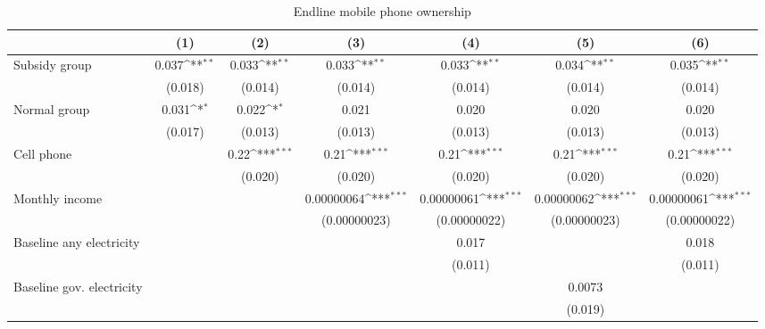 \begin{table}[htbp]\centering
\def\sym#1{\ifmmode^{#1}\else\(^{#1}\)\fi}
\caption{Endline mobile phone ownership}
\begin{tabular*}{1\hsize}{@{\hskip\tabcolsep\extracolsep\fill}l*{6}{c}}
\toprule
                &\multicolumn{1}{c}{(1)}         &\multicolumn{1}{c}{(2)}         &\multicolumn{1}{c}{(3)}         &\multicolumn{1}{c}{(4)}         &\multicolumn{1}{c}{(5)}         &\multicolumn{1}{c}{(6)}         \\
\midrule
Subsidy group   &    0.037\sym{**} &    0.033\sym{**} &    0.033\sym{**} &    0.033\sym{**} &    0.034\sym{**} &    0.035\sym{**} \\
                &  (0.018)         &  (0.014)         &  (0.014)         &  (0.014)         &  (0.014)         &  (0.014)         \\
Normal group    &    0.031\sym{*}  &    0.022\sym{*}  &    0.021         &    0.020         &    0.020         &    0.020         \\
                &  (0.017)         &  (0.013)         &  (0.013)         &  (0.013)         &  (0.013)         &  (0.013)         \\
Cell phone      &                  &     0.22\sym{***}&     0.21\sym{***}&     0.21\sym{***}&     0.21\sym{***}&     0.21\sym{***}\\
                &                  &  (0.020)         &  (0.020)         &  (0.020)         &  (0.020)         &  (0.020)         \\
Monthly income  &                  &                  &0.00000064\sym{***}&0.00000061\sym{***}&0.00000062\sym{***}&0.00000061\sym{***}\\
                &                  &                  &(0.00000023)         &(0.00000022)         &(0.00000023)         &(0.00000022)         \\
Baseline any electricity&                  &                  &                  &    0.017         &                  &    0.018         \\
                &                  &                  &                  &  (0.011)         &                  &  (0.011)         \\
Baseline gov. electricity&                  &                  &                  &                  &   0.0073         &                  \\
                &                  &                  &                  &                  &  (0.019)         &                  \\

\end{tabular*}
\end{table}
